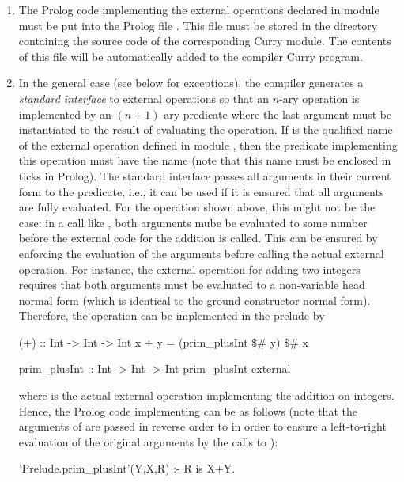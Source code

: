 \begin{enumerate}
\item
The Prolog code implementing the external operations declared
in module  must be put into the Prolog file .
This file must be stored in the directory
containing the source code of the corresponding Curry module.
The contents of this file will be automatically added to the
compiler Curry program.

\item
In the general case (see below for exceptions),
the \CYS compiler generates a \emph{standard interface} to
external operations so that an $n$-ary operation is
implemented by an $(n+1)$-ary predicate where the last argument must
be instantiated to the result of evaluating the operation.
If  is the qualified name of the
external operation  defined in module ,
then the predicate implementing this operation
must have the name  (note that this name
must be enclosed in ticks in Prolog).
The standard interface passes all arguments in their current form
to the predicate, i.e., it can be used if it is ensured that
all arguments are fully evaluated.
For the operation \code{(+)} shown above, this might not be the
case: in a call like , both arguments
mube be evaluated to some number before the external code
for the addition is called.
This can be ensured by enforcing the evaluation of the arguments
before calling the actual external operation.
For instance, the external operation for adding two integers
requires that both arguments must be evaluated to
a non-variable head normal form
(which is identical to the ground constructor normal form). Therefore,
the operation \ccode{+} can be implemented in the prelude by
\begin{curry}
(+)   :: Int -> Int -> Int
x + y = (prim_plusInt $\$$# y) $\$$# x

prim_plusInt :: Int -> Int -> Int
prim_plusInt external
\end{curry}
where  is the actual external operation implementing
the addition on integers.
Hence, the Prolog code implementing  can be as
follows (note that the arguments of \code{(+)} are passed in reverse
order to  in order to ensure a left-to-right
evaluation of the original arguments by the calls to \code{(\$\#)}):
\begin{curry}
'Prelude.prim_plusInt'(Y,X,R) :- R is X+Y.
\end{curry}


\end{enumerate}
